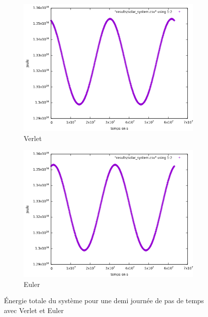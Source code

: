 \documentclass[11pt]{article}
\begin{document}
\begin{figure}[H]
\begin{subfigure}{0.5\textwidth}
\includegraphics[width=1\linewidth]{eulerverlet/energy_sol_syst_verlet.png}
\caption{Verlet}
\label{fig:7subim1}
\end{subfigure}
\begin{subfigure}{0.5\textwidth}
\includegraphics[width=1\linewidth]{eulerverlet/energy_sol_syst_euler.png}
\caption{Euler}
\label{fig:7subim2}
\end{subfigure}

\caption{Énergie totale du système pour une demi journée de pas de temps avec Verlet et Euler}
\label{fig:image2}
\end{figure}
\end{document}
